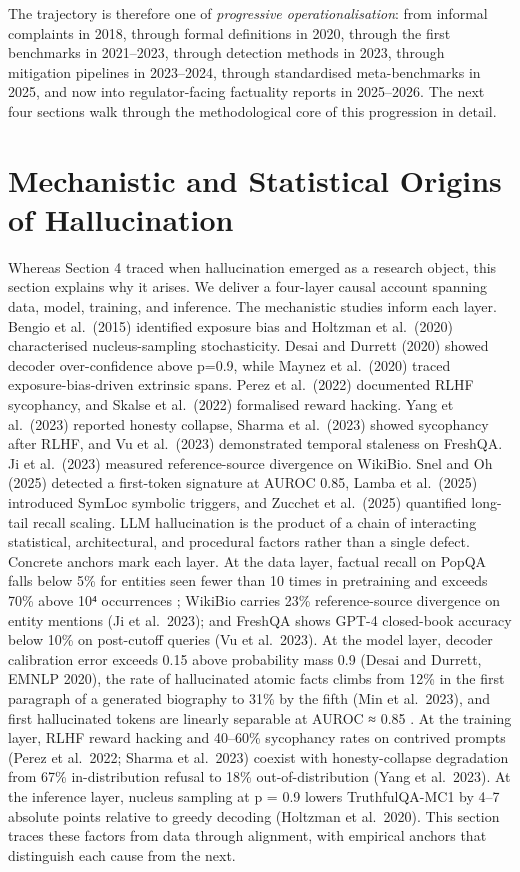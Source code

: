 \documentclass{article}
\begin{document}
The trajectory is therefore one of \emph{progressive operationalisation}: from informal complaints in 2018, through formal definitions in 2020, through the first benchmarks in 2021--2023, through detection methods in 2023, through mitigation pipelines in 2023--2024, through standardised meta-benchmarks in 2025, and now into regulator-facing factuality reports in 2025--2026. The next four sections walk through the methodological core of this progression in detail.

\section{Mechanistic and Statistical Origins of Hallucination}\label{mechanistic-and-statistical-origins-of-hallucination}

Whereas Section 4 traced when hallucination emerged as a research object, this section explains why it arises. We deliver a four-layer causal account spanning data, model, training, and inference. The mechanistic studies inform each layer. Bengio et al.~(2015) identified exposure bias and Holtzman et al.~(2020) characterised nucleus-sampling stochasticity. Desai and Durrett (2020) showed decoder over-confidence above p=0.9, while Maynez et al.~(2020) traced exposure-bias-driven extrinsic spans. Perez et al.~(2022) documented RLHF sycophancy, and Skalse et al.~(2022) formalised reward hacking. Yang et al.~(2023) reported honesty collapse, Sharma et al.~(2023) showed sycophancy after RLHF, and Vu et al.~(2023) demonstrated temporal staleness on FreshQA. Ji et al.~(2023) measured reference-source divergence on WikiBio. Snel and Oh (2025) detected a first-token signature at AUROC 0.85, Lamba et al.~(2025) introduced SymLoc symbolic triggers, and Zucchet et al.~(2025) quantified long-tail recall scaling. LLM hallucination is the product of a chain of interacting statistical, architectural, and procedural factors rather than a single defect. Concrete anchors mark each layer. At the data layer, factual recall on PopQA falls below 5\% for entities seen fewer than 10 times in pretraining and exceeds 70\% above 10⁴ occurrences \citep{zucchet2025howdolanguagemodel}; WikiBio carries 23\% reference-source divergence on entity mentions (Ji et al.~2023); and FreshQA shows GPT-4 closed-book accuracy below 10\% on post-cutoff queries (Vu et al.~2023). At the model layer, decoder calibration error exceeds 0.15 above probability mass 0.9 (Desai and Durrett, EMNLP 2020), the rate of hallucinated atomic facts climbs from 12\% in the first paragraph of a generated biography to 31\% by the fifth (Min et al.~2023), and first hallucinated tokens are linearly separable at AUROC ≈ 0.85 \citep{snel2025firsthallucination}. At the training layer, RLHF reward hacking and 40--60\% sycophancy rates on contrived prompts (Perez et al.~2022; Sharma et al.~2023) coexist with honesty-collapse degradation from 67\% in-distribution refusal to 18\% out-of-distribution (Yang et al.~2023). At the inference layer, nucleus sampling at p = 0.9 lowers TruthfulQA-MC1 by 4--7 absolute points relative to greedy decoding (Holtzman et al.~2020). This section traces these factors from data through alignment, with empirical anchors that distinguish each cause from the next.
\end{document}
